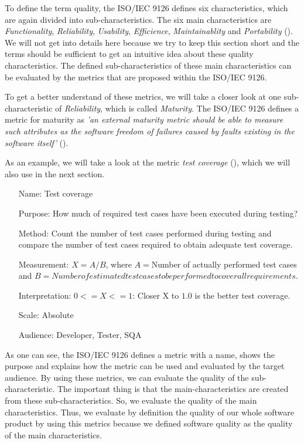 To define the term quality, the ISO/IEC 9126 defines six characteristics, which are again divided into sub-characteristics. The six main characteristics are \emph{Functionality}, \emph{Reliability}, \emph{Usability}, \emph{Efficience}, \emph{Maintainablity} and \emph{Portability} (\cite{jung2004measuring}). We will not get into details here because we try to keep this section short and the terms should be sufficient to get an intuitive idea about these quality characteristics. The defined sub-characteristics of these main characteristics can be evaluated by the metrics that are proposed within the ISO/IEC 9126. 

To get a better understand of these metrics, we will take a closer look at one sub-characteristic of \emph{Reliability}, which is called \emph{Maturity}. The ISO/IEC 9126 defines a metric for maturity as \emph{'an external maturity metric should be able to measure such attributes as the software freedom of failures caused by faults existing in the software itself'} (\cite{ISOIEC9126}).

As an example, we will take a look at the metric \emph{test coverage} (\cite{ISOIEC9126}), which we will also use in the next section. 

\begin{itemize}
	\item[Name:] Test coverage
	\item[Purpose:] How much of required test cases have been executed during testing?
	\item[Method:] Count the number of test cases performed during testing and compare the number of test cases required to obtain adequate test coverage.
	\item[Measurement:] $X=A/B$, where $A=$Number of actually performed test cases and $B=Number of estimated test cases to be performed to cover all requirements$.
	\item[Interpretation:] $0<=X<=1$: Closer X to $1.0$ is the better test coverage.
	\item[Scale:] Absolute
	\item[Audience:] Developer, Tester, SQA
\end{itemize}

As one can see, the ISO/IEC 9126 defines a metric with a name, shows the purpose and explains how the metric can be used and evaluated by the target audience. By using these metrics, we can evaluate the quality of the sub-characteristic. The important thing is that the main-characteristics are created from these sub-characteristics. So, we evaluate the quality of the main characteristics. Thus, we evaluate by definition the quality of our whole software product by using this metrics because we defined software quality as the quality of the main characteristics.        

